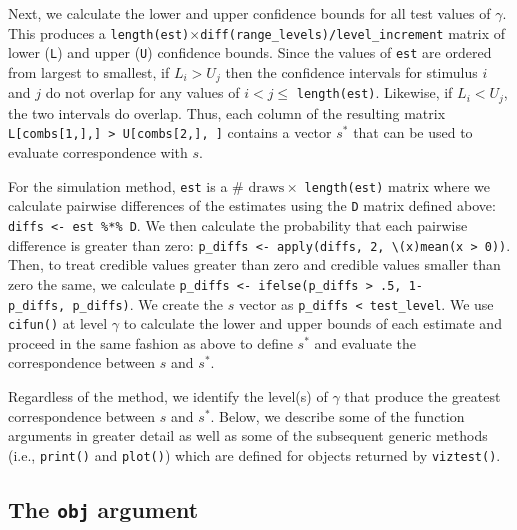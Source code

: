 Next, we calculate the lower and upper confidence bounds for all test values of \(\gamma\). This produces a \texttt{length(est)}\(\times\)\texttt{diff(range\_levels)/level\_increment} matrix of lower (\texttt{L}) and upper (\texttt{U}) confidence bounds. Since the values of \texttt{est} are ordered from largest to smallest, if \(L_i > U_j\) then the confidence intervals for stimulus \(i\) and \(j\) do not overlap for any values of \(i < j \leq\) \texttt{length(est)}. Likewise, if \(L_i < U_j\), the two intervals do overlap. Thus, each column of the resulting matrix \texttt{L{[}combs{[}1,{]},{]}\ \textgreater{}\ U{[}combs{[}2,{]},\ {]}} contains a vector \(s^{*}\) that can be used to evaluate correspondence with \(s\).

For the simulation method, \texttt{est} is a \(\#\text{ draws} \times\) \texttt{length(est)} matrix where we calculate pairwise differences of the estimates using the \texttt{D} matrix defined above: \texttt{diffs\ \textless{}-\ est\ \%*\%\ D}. We then calculate the probability that each pairwise difference is greater than zero: \texttt{p\_diffs\ \textless{}-\ apply(diffs,\ 2,\ \textbackslash{}(x)mean(x\ \textgreater{}\ 0))}. Then, to treat credible values greater than zero and credible values smaller than zero the same, we calculate \texttt{p\_diffs\ \textless{}-\ ifelse(p\_diffs\ \textgreater{}\ .5,\ 1-p\_diffs,\ p\_diffs)}. We create the \(s\) vector as \texttt{p\_diffs\ \textless{}\ test\_level}. We use \texttt{cifun()} at level \(\gamma\) to calculate the lower and upper bounds of each estimate and proceed in the same fashion as above to define \(s^{*}\) and evaluate the correspondence between \(s\) and \(s^{*}\).

Regardless of the method, we identify the level(s) of \(\gamma\) that produce the greatest correspondence between \(s\) and \(s^{*}\). Below, we describe some of the function arguments in greater detail as well as some of the subsequent generic methods (i.e., \texttt{print()} and \texttt{plot()}) which are defined for objects returned by \texttt{viztest()}.

\subsection{\texorpdfstring{The \texttt{obj} argument}{The obj argument}}\label{the-obj-argument}


